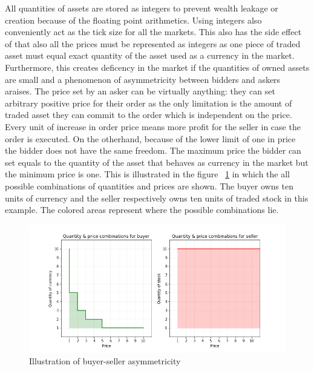 All quantities of assets are stored as integers to prevent wealth leakage
or creation because of the floating point arithmetics. Using integers also
conveniently act as the tick size for all the markets. This also has the side effect
of that also all the prices must be represented as integers as one piece
of traded asset must equal exact quantity of the asset used as a currency
in the market. Furthermore, this creates deficency in the market if the quantities
of owned assets are small and a phenomenon of asymmetricity between bidders and askers
araises. The price set by an asker can be virtually anything: they can set
arbitrary positive price for their order as the only limitation is the amount
of traded asset they can commit to the order which is independent on the price. 
Every unit of increase in order price means more profit for the seller
in case the order is executed. On the otherhand, because of the 
lower limit of one in price the bidder does not have the same freedom.
The maximum price the bidder can set equals to the quantity of the asset
that behaves as currency in the market but the minimum price is one. This is
illustrated in the figure ~\ref{fig:buy_sell_asym} in which the all possible
combinations of quantities and prices are shown. The buyer owns
ten units of currency and the seller respectively owns ten units of traded stock in
this example. The colored areas represent where the possible combinations
lie.

 \begin{figure}
    \includegraphics[width=\linewidth]{plots/buyer_seller_asymmetricity.png}
    \caption{Illustration of buyer-seller asymmetricity}
    \label{fig:buy_sell_asym}
\end{figure}

